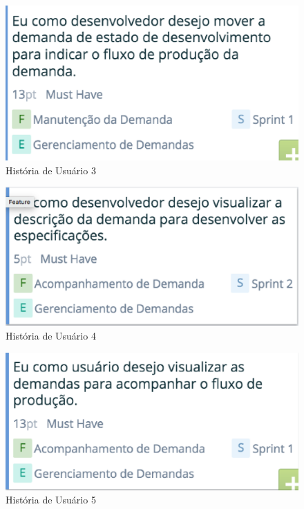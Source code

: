 \begin{figure}[H]
    \centering
	\includegraphics[keepaspectratio=true,scale=0.5]{figuras/time3.eps}
    \caption{História de Usuário 3}
    \label{fig:roadmap}
\end{figure}

\begin{figure}[H]
    \centering
	\includegraphics[keepaspectratio=true,scale=0.5]{figuras/time4.eps}
    \caption{História de Usuário 4}
    \label{fig:roadmap}
\end{figure}

\begin{figure}[H]
    \centering
	\includegraphics[keepaspectratio=true,scale=0.5]{figuras/time5.eps}
    \caption{História de Usuário 5}
    \label{fig:roadmap}
\end{figure}

